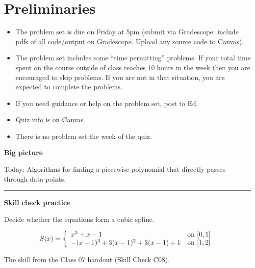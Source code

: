 \documentclass[12pt,letterpaper,noanswers]{exam}
\begin{document}
 \pdfpageheight 11in 
  \pdfpagewidth 8.5in

\noindent 

\section*{Preliminaries}

\begin{itemize}
\itemsep0pt
\item The problem set is due on Friday at 5pm (submit via Gradescope: include pdfs of all code/output on Gradescope.  Upload any source code to Canvas).
\item The problem set includes some ``time permitting'' problems.  If your total time spent on the course outside of class reaches 10 hours in the week then you are encouraged to skip problems.  If you are not in that situation, you are expected to complete the problems.
\item If you need guidance or help on the problem set, post to Ed.
\item Quiz info is on Canvas.
\item There is no problem set the week of the quiz.
\end{itemize}



\noindent\textbf{Big picture}

Today: Algorithms for finding a piecewise polynomial that directly passes through data points.

\vspace{0.2cm}
\hrule
\vspace{0.2cm}

\noindent \textbf{Skill check practice}
\begin{questions}
\item 
Decide whether the equations form a cubic spline.

\[S(x) = \left\{\begin{array}{l l}
x^3 + x - 1 & \text{on }[0,1] \\
-(x-1)^3 + 3(x-1)^2 + 3(x-1) + 1 & \text{on }[1,2] \\
\end{array}\right.\]

\item The skill from the Class 07 handout (Skill Check C08).
\end{questions}
\end{document}
